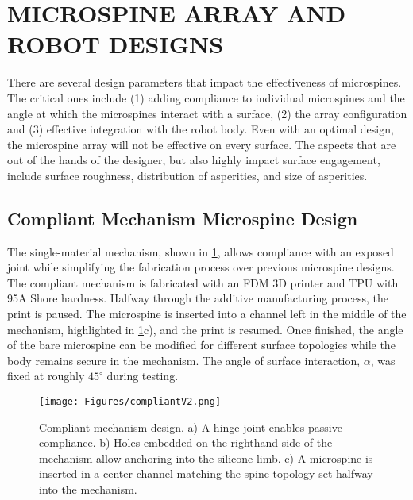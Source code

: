 \section{MICROSPINE ARRAY AND ROBOT DESIGNS}
There are several design parameters that impact the effectiveness of microspines. The critical ones include (1) adding compliance to individual microspines and  the angle at which the microspines interact with a surface, (2) the array configuration and (3) effective integration with the robot body. Even with an optimal design, the microspine array will not be effective on every surface. The aspects that are out of the hands of the designer, but also highly impact surface engagement, include surface roughness, distribution of asperities, and size of asperities. 


\subsection{Compliant Mechanism Microspine Design}
The single-material mechanism, shown in \Fig \ref{fig:comp}, allows compliance with an exposed joint while simplifying the fabrication process over previous microspine designs. The compliant mechanism is fabricated with an FDM 3D printer and TPU with 95A Shore hardness. Halfway through the additive manufacturing process, the print is paused. The microspine is inserted into a channel left in the middle of the mechanism, highlighted in \Fig \ref{fig:comp}c), and the print is resumed. Once finished, the angle of the bare microspine can be modified for different surface topologies while the body remains secure in the mechanism. The angle of surface interaction, $\alpha$, was fixed at roughly $45^{\circ}$ during testing.



\begin{figure}[h]
    \centering
    \texttt{[image: Figures/compliantV2.png]}
    \caption{Compliant mechanism design. a) A hinge joint enables passive compliance.  b) Holes embedded on the righthand side of the mechanism allow anchoring into the silicone limb. c) A microspine is inserted in a center channel matching the spine topology set halfway into the mechanism.}
    \label{fig:comp}
\end{figure}



